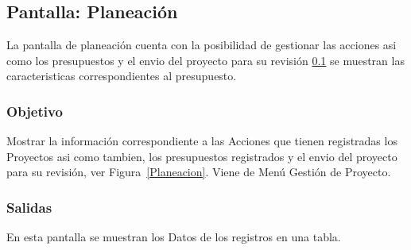 \subsection{Pantalla: Planeación}\label{pantalla:Planeacion}%
La pantalla de planeación cuenta con la posibilidad de gestionar las acciones asi como los presupuestos y el envio del proyecto para su revisión \ref{pantalla:Planeacion} se muestran las caracteristicas correspondientes al presupuesto.

\subsubsection{Objetivo}
  Mostrar la información correspondiente a las Acciones que tienen registradas los Proyectos asi como tambien, los presupuestos registrados y el envio del proyecto 
  para su revisión, ver Figura~\ref{Planeacion}. Viene de Menú Gestión de Proyecto.


\subsubsection{Salidas}
  En esta pantalla se muestran los Datos de los  registros en una tabla.



